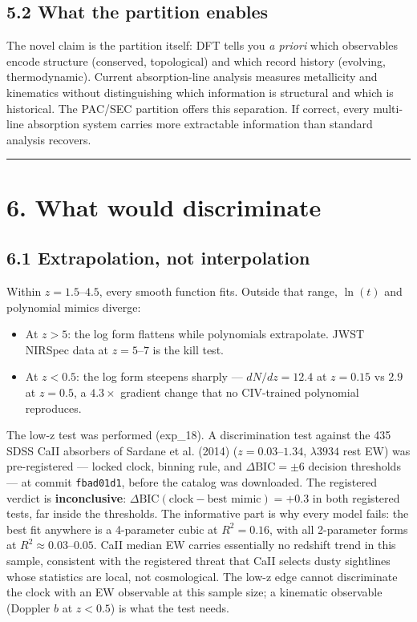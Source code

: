 \documentclass[11pt,a4paper]{article}
\providecommand{\tightlist}{\setlength{\itemsep}{0pt}\setlength{\parskip}{0pt}}
\begin{document}
\subsection*{5.2 What the partition enables}

The novel claim is the partition itself: DFT tells you \emph{a priori} which observables encode structure (conserved, topological) and which record history (evolving, thermodynamic). Current absorption-line analysis measures metallicity and kinematics without distinguishing which information is structural and which is historical. The PAC/SEC partition offers this separation. If correct, every multi-line absorption system carries more extractable information than standard analysis recovers.

\begin{center}\rule{0.5\linewidth}{0.4pt}\end{center}

\section*{6. What would discriminate}

\subsection*{6.1 Extrapolation, not interpolation}

Within $z = 1.5$–$4.5$, every smooth function fits. Outside that range, $\ln(t)$ and polynomial mimics diverge:

\begin{itemize}\tightlist
\item At $z > 5$: the log form flattens while polynomials extrapolate. JWST NIRSpec data at $z = 5$–$7$ is the kill test.
\item At $z < 0.5$: the log form steepens sharply — $dN/dz = 12.4$ at $z = 0.15$ vs $2.9$ at $z = 0.5$, a $4.3\times$ gradient change that no CIV-trained polynomial reproduces.
\end{itemize}

The low-z test was performed (exp\_18). A discrimination test against the 435 SDSS CaII absorbers of Sardane et al. (2014) ($z = 0.03$–$1.34$, $\lambda 3934$ rest EW) was pre-registered — locked clock, binning rule, and $\Delta\text{BIC} = \pm 6$ decision thresholds — at commit \texttt{fbad01d1}, before the catalog was downloaded. The registered verdict is \textbf{inconclusive}: $\Delta\text{BIC}(\text{clock} - \text{best mimic}) = +0.3$ in both registered tests, far inside the thresholds. The informative part is why every model fails: the best fit anywhere is a 4-parameter cubic at $R^2 = 0.16$, with all 2-parameter forms at $R^2 \approx 0.03$–$0.05$. CaII median EW carries essentially no redshift trend in this sample, consistent with the registered threat that CaII selects dusty sightlines whose statistics are local, not cosmological. The low-z edge cannot discriminate the clock with an EW observable at this sample size; a kinematic observable (Doppler $b$ at $z < 0.5$) is what the test needs.
\end{document}
